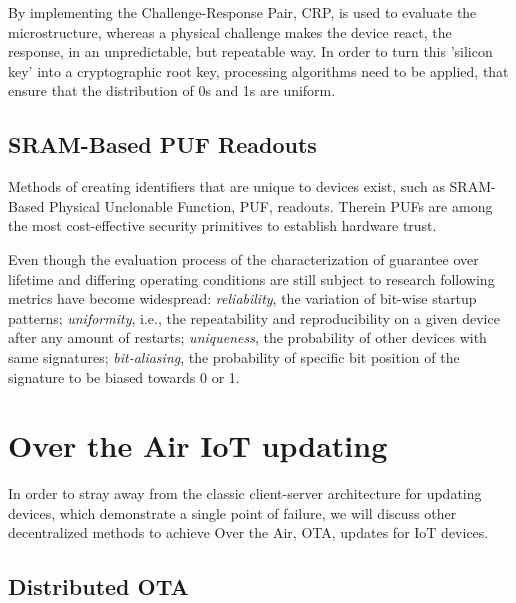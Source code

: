 By implementing the Challenge-Response Pair, CRP, is used to evaluate the microstructure, whereas a physical challenge
makes the device react, the response, in an unpredictable, but repeatable way.
In order to turn this 'silicon key' into a cryptographic root key, processing algorithms need to be applied, that ensure
that the distribution of 0s and 1s are uniform. \cite{herder2014physical}

\subsection{SRAM-Based PUF Readouts} %
\label{sec:SRAM-Based PUF Readouts}

Methods of creating identifiers that are unique to devices exist, such as SRAM-Based Physical Unclonable Function, PUF,
readouts. Therein PUFs are among the most cost-effective security primitives to establish hardware trust.
\cite{holcomb2007initial}

Even though the evaluation process of the characterization of guarantee over lifetime and differing operating conditions
are still subject to research following metrics have become widespread: \textit{reliability}, the variation of bit-wise
startup patterns; \textit{uniformity}, i.e., the repeatability and reproducibility on a given device after any amount of
restarts; \textit{uniqueness}, the probability of other devices with same signatures; \textit{bit-aliasing}, the
probability of specific bit position of the signature to be biased towards 0 or 1. \cite{vinagrero2023sram}


\section{Over the Air IoT updating} %
\label{sec:Over the Air  IoT updating}
In order to stray away from the classic client-server architecture for updating devices, which demonstrate a single
point of failure, we will discuss other decentralized methods to achieve Over the Air, OTA, updates for IoT devices.

\subsection{Distributed OTA} %
\label{sub:Distributed OTA}


